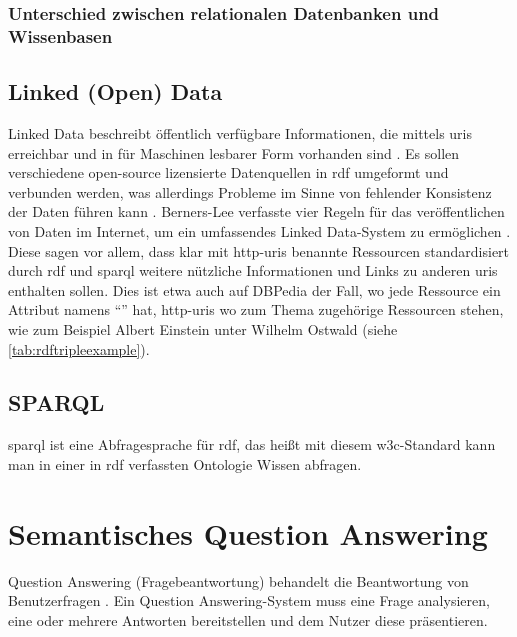 \subsubsection{Unterschied zwischen relationalen Datenbanken und Wissenbasen}



\subsection{Linked (Open) Data}

Linked Data beschreibt öffentlich verfügbare Informationen, die mittels \acp{uri} erreichbar und in für Maschinen lesbarer Form vorhanden sind \citep{linkeddata}.
Es sollen verschiedene open-source lizensierte Datenquellen in \ac{rdf} umgeformt und verbunden werden, was allerdings Probleme im Sinne von fehlender Konsistenz der Daten führen kann \citep{semanticwebreview}.
Berners-Lee verfasste vier Regeln für das veröffentlichen von Daten im Internet, um ein umfassendes Linked Data-System zu ermöglichen \citep{linkeddatadesignissues}.
Diese sagen vor allem, dass klar mit \ac{http}-\acp{uri} benannte Ressourcen standardisiert durch \ac{rdf} und \ac{sparql} weitere nützliche Informationen und Links zu anderen \acp{uri} enthalten sollen.
Dies ist etwa auch auf DBPedia der Fall, wo jede Ressource ein Attribut namens \enquote{} hat, \ac{http}-\acp{uri} wo zum Thema zugehörige Ressourcen stehen,
wie zum Beispiel Albert Einstein unter Wilhelm Ostwald (siehe \cref{tab:rdftripleexample}).

\subsection{SPARQL}

\ac{sparql} ist eine Abfragesprache für \ac{rdf}, das heißt mit diesem \ac{w3c}-Standard kann man in einer in \ac{rdf} verfassten Ontologie Wissen abfragen.

\section{Semantisches Question Answering}

\begin{definition}
Question Answering (Fragebeantwortung) behandelt die Beantwortung von Benutzerfragen \citep{qadefinition}.
Ein Question Answering-System muss eine Frage analysieren, eine oder mehrere Antworten bereitstellen und dem Nutzer diese präsentieren.
\end{definition}

